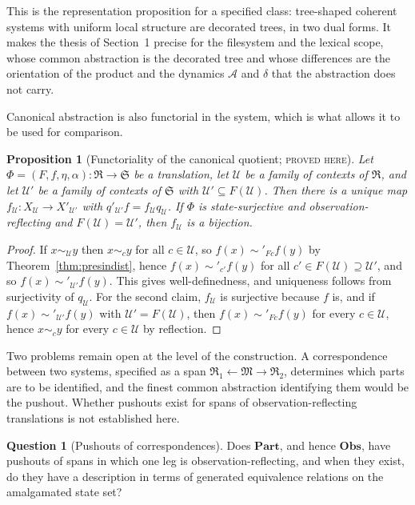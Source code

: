 \documentclass[11pt]{article}
\newtheorem{proposition}[theorem]{Proposition}
\theoremstyle{definition}
\newtheorem{question}[theorem]{Question}
\theoremstyle{remark}
\newcommand{\stN}{\textsc{proved here}}
\newcommand{\cA}{\mathcal A}
\newcommand{\cU}{\mathcal U}
\newcommand{\fR}{\mathfrak R}
\newcommand{\fS}{\mathfrak S}
\newcommand{\fM}{\mathfrak M}
\newcommand{\Obs}{\mathbf{Obs}}
\newcommand{\Part}{\mathbf{Part}}
\newcommand{\sk}{\sim}
\begin{document}
This is the representation proposition for a specified class: tree-shaped coherent systems with uniform local structure are decorated trees, in two dual forms. It makes the thesis of Section~1 precise for the filesystem and the lexical scope, whose common abstraction is the decorated tree and whose differences are the orientation of the product and the dynamics $\cA$ and $\delta$ that the abstraction does not carry.

Canonical abstraction is also functorial in the system, which is what allows it to be used for comparison.

\begin{proposition}[Functoriality of the canonical quotient; \stN]\label{prop:functorial}
Let $\Phi=(F,f,\eta,\alpha):\fR\to\fS$ be a translation, let $\cU$ be a family of contexts of $\fR$, and let $\cU'$ be a family of contexts of $\fS$ with $\cU'\subseteq F(\cU)$. Then there is a unique map $f_{\cU}:X_{\cU}\to X'_{\cU'}$ with $q'_{\cU'}f=f_{\cU}q_{\cU}$. If $\Phi$ is state-surjective and observation-reflecting and $F(\cU)=\cU'$, then $f_{\cU}$ is a bijection.
\end{proposition}
\begin{proof}
If $x\sk_{\cU}y$ then $x\sk_cy$ for all $c\in\cU$, so $f(x)\sk'_{Fc}f(y)$ by Theorem~\ref{thm:presindist}, hence $f(x)\sk'_{c'}f(y)$ for all $c'\in F(\cU)\supseteq\cU'$, and so $f(x)\sk'_{\cU'}f(y)$. This gives well-definedness, and uniqueness follows from surjectivity of $q_\cU$. For the second claim, $f_\cU$ is surjective because $f$ is, and if $f(x)\sk'_{\cU'}f(y)$ with $\cU'=F(\cU)$, then $f(x)\sk'_{Fc}f(y)$ for every $c\in\cU$, hence $x\sk_cy$ for every $c\in\cU$ by reflection.
\end{proof}

Two problems remain open at the level of the construction. A correspondence between two systems, specified as a span $\fR_1\leftarrow\fM\to\fR_2$, determines which parts are to be identified, and the finest common abstraction identifying them would be the pushout. Whether pushouts exist for spans of observation-reflecting translations is not established here.

\begin{question}[Pushouts of correspondences]\label{q:pushout}
Does $\Part$, and hence $\Obs$, have pushouts of spans in which one leg is observation-reflecting, and when they exist, do they have a description in terms of generated equivalence relations on the amalgamated state set?
\end{question}
\end{document}
